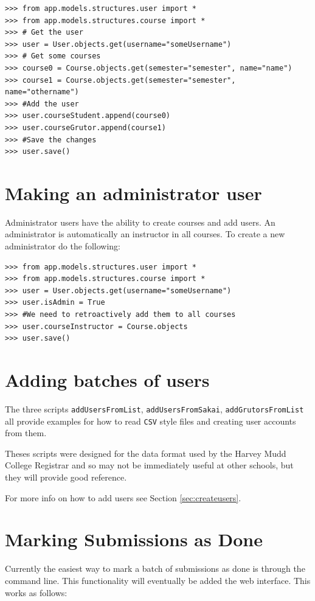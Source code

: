 \documentclass[11pt]{report}
\begin{document}
\begin{verbatim}
>>> from app.models.structures.user import *
>>> from app.models.structures.course import *
>>> # Get the user
>>> user = User.objects.get(username="someUsername")
>>> # Get some courses
>>> course0 = Course.objects.get(semester="semester", name="name")
>>> course1 = Course.objects.get(semester="semester", name="othername")
>>> #Add the user
>>> user.courseStudent.append(course0)
>>> user.courseGrutor.append(course1)
>>> #Save the changes
>>> user.save()
\end{verbatim}

\section{Making an administrator user}
Administrator users have the ability to create courses and add users. An administrator
is automatically an instructor in all courses. To create a new administrator do the
following:

\begin{verbatim}
>>> from app.models.structures.user import *
>>> from app.models.structures.course import *
>>> user = User.objects.get(username="someUsername")
>>> user.isAdmin = True
>>> #We need to retroactively add them to all courses
>>> user.courseInstructor = Course.objects
>>> user.save()
\end{verbatim}

\section{Adding batches of users}
The three scripts \texttt{addUsersFromList}, \texttt{addUsersFromSakai},
\texttt{addGrutorsFromList} all provide examples for how to read \texttt{CSV}
style files and creating user accounts from them.

Theses scripts were designed for the data format used by the Harvey Mudd
College Registrar and so may not be immediately useful at other schools, but
they will provide good reference. 

For more info on how to add users see Section \ref{sec:createusers}.

\section{Marking Submissions as Done}
Currently the easiest way to mark a batch of submissions as done is through the command line.
This functionality will eventually be added the web interface. This works as follows:
\end{document}
